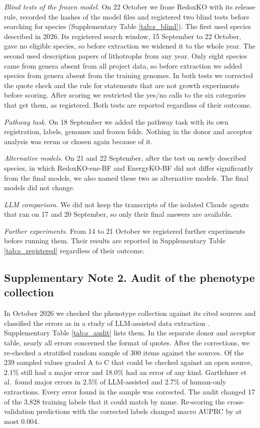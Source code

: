 \documentclass[10pt,a4paper,onecolumn]{article}
\begin{document}
{\emph{Blind tests of the frozen model.} On 22 October we froze RedoxKO
with its release rule, recorded the hashes of the model files and
registered two blind tests before searching for species (Supplementary
Table \ref{tab:s_blind}). The first used species described in 2026. Its
registered search window, 15 September to 22 October, gave no eligible
species, so before extraction we widened it to the whole year. The
second used description papers of lithotrophs from any year. Only eight
species came from genera absent from all project data, so before
extraction we added species from genera absent from the training
genomes. In both tests we corrected the quote check and the rule for
statements that are not growth experiments before scoring. After scoring
we restricted the yes/no calls to the six categories that get them, as
registered. Both tests are reported regardless of their outcome.

\emph{Pathway task.} On 18 September we added the pathway task with its
own registration, labels, genomes and frozen folds. Nothing in the donor
and acceptor analysis was rerun or chosen again because of it.

\emph{Alternative models.} On 21 and 22 September, after the test on
newly described species, in which RedoxKO-ens-BF and EnergyKO-BF did not
differ significantly from the final models, we also named these two as
alternative models. The final models did not change.

\emph{LLM comparison.} We did not keep the transcripts of the isolated
Claude agents that ran on 17 and 20 September, so only their final
answers are available.

\emph{Further experiments.} From 14 to 21 October we registered further
experiments before running them. Their results are reported in
Supplementary Table \ref{tab:s_registered} regardless of their outcome.

\subsection{Supplementary Note 2. Audit of the phenotype
collection}\label{supplementary-note-2.-audit-of-the-phenotype-collection}

In October 2026 we checked the phenotype collection against its cited
sources and classified the errors as in a study of LLM-assisted data
extraction \autocite{Gartlehner2025}. Supplementary Table
\ref{tab:s_audit} lists them. In the separate donor and acceptor table,
nearly all errors concerned the format of quotes. After the corrections,
we re-checked a stratified random sample of 300 items against the
sources. Of the 239 sampled values graded A to C that could be checked
against an open source, 2.1\% still had a major error and 18.0\% had an
error of any kind. Gartlehner et al.~found major errors in 2.5\% of
LLM-assisted and 2.7\% of human-only extractions. Every error found in
the sample was corrected. The audit changed 17 of the 3,828 training
labels that it could match by name. Re-scoring the cross-validation
predictions with the corrected labels changed macro AUPRC by at most
0.004.

}
\end{document}
